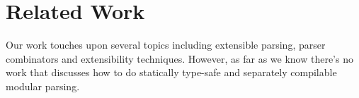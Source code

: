 \section{Related Work}\label{sec:relatedwork}

%
%
%
%

Our work touches upon several topics including extensible parsing,
parser combinators and extensibility techniques. However, as far as we
know there's no work that discusses how to do statically type-safe and
separately compilable modular parsing.

\begin{comment}
There has been a
great amount of related papers on those topics. Some
inspired us of this paper and encourage us for more exploration. This
section will try to lead a discussion on what difference we have made.
\end{comment}

